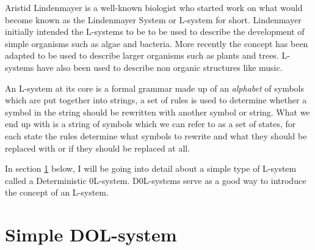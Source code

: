 \begin{flushleft}

Aristid Lindenmayer is a well-known biologist who started work on what would become known as the Lindenmayer System or L-system for short. Lindenmayer initially intended the L-systems to be to be used to describe the development of simple organisms such as algae and bacteria. More recently the concept has been adapted to be used to describe larger organisms such as plants and trees. L-systems have also been used to describe non organic structures like music. \cite{worth2005growing} \\

\vspace{5mm}

An L-system at its core is a formal grammar made up of an \textit{alphabet} of symbols which are put together into strings, a set of rules is used to determine whether a symbol in the string should be rewritten with another symbol or string. What we end up with is a string of symbols which we can refer to as a set of states, for each state the rules determine what symbols to rewrite and what they should be replaced with or if they should be replaced at all.\\

\vspace{5mm}


In section \ref{Simple DOL-systems} below, I will be going into detail about a simple type of L-system called a Deterministic 0L-system.  D0L-systems serve as a good way to introduce the concept of an L-system.

\end{flushleft}

\section{Simple DOL-system} \label{Simple DOL-systems}

